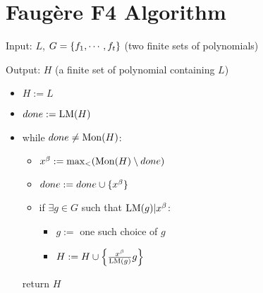\chapter{Faug{\`e}re F4 Algorithm}

\begin{latexonly}
\begin{definition}
    Input: \(L\), \(G = \{ f_1, \cdots, f_t \}\)
    (two finite sets of polynomials)

    Output: \(H\) (a finite set of polynomial containing \(L\))

    \begin{itemize}
        \item \(H := L\)
        \item \(done := \mathrm{LM}(H)\)
        \item while \(done \ne \mathrm{Mon}(H)\):
        \begin{itemize}
            \item \(x^\beta := \max_{<} (\mathrm{Mon}(H) \setminus done)\)
            \item \(done := done \cup \{ x^\beta \}\)
            \item if \(\exists g \in G\) such that \(\mathrm{LM}(g) | x^\beta\):
                \begin{itemize}
                    \item \(g :=\) one such choice of \(g\)
                    \item \(H := H \cup \left\{ \frac{x^\beta}{\mathrm{LM}(g)} g \right\}\)
                \end{itemize}
        \end{itemize}
        return \(H\)
    \end{itemize}
\end{definition}
\end{latexonly}

